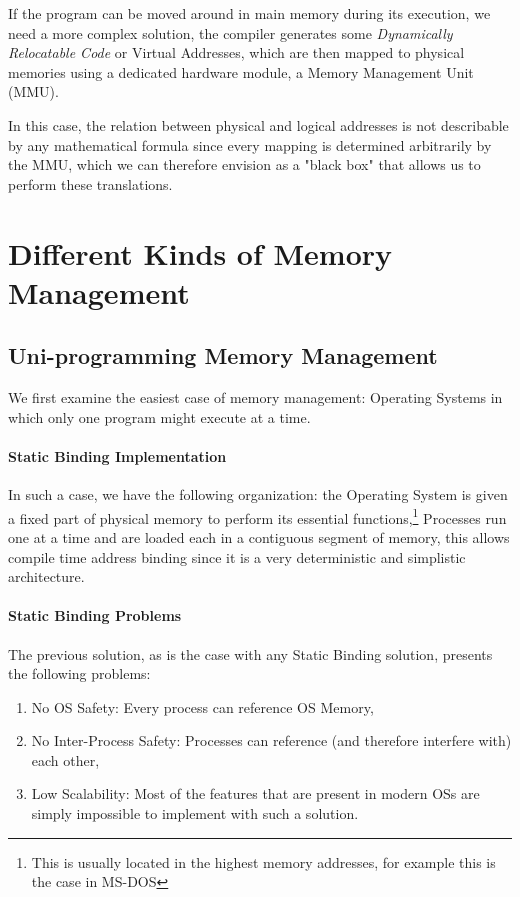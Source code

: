 \documentclass[openright, twoside]{report}
\theoremstyle{definition}
\theoremstyle{example}
\begin{document}
		If the program can be moved around in main memory during its execution, we need a more complex solution, the compiler 
		generates some \emph{Dynamically Relocatable Code} or Virtual Addresses, which are then mapped to physical memories using 
		a dedicated hardware module, a Memory Management Unit (MMU).

		In this case, the relation between physical and logical addresses is not describable by any mathematical formula since 
		every mapping is determined arbitrarily by the MMU, which we can therefore envision as a "black box" that allows us 
		to perform these translations.
	
	\section{Different Kinds of Memory Management}
		\subsection{Uni-programming Memory Management}

		We first examine the easiest case of memory management: Operating Systems in which only one program might execute at a time.

		\paragraph{Static Binding Implementation}
		In such a case, we have the following organization: the Operating System is given a fixed part of physical memory to perform 
		its essential functions,\footnote{This is usually located in the highest memory addresses, for example this is the case in MS-DOS}
		Processes run one at a time and are loaded each in a contiguous segment of memory, this allows compile time address binding 
		since it is a very deterministic and simplistic architecture.

		\paragraph{Static Binding Problems}
		The previous solution, as is the case with any Static Binding solution, presents the following problems:
		\begin{enumerate}
			\item No OS Safety: Every process can reference OS Memory,
			\item No Inter-Process Safety: Processes can reference (and therefore interfere with) each other,
			\item Low Scalability: Most of the features that are present in modern OSs are simply impossible to 
			implement with such a solution.
		\end{enumerate}
\end{document}
